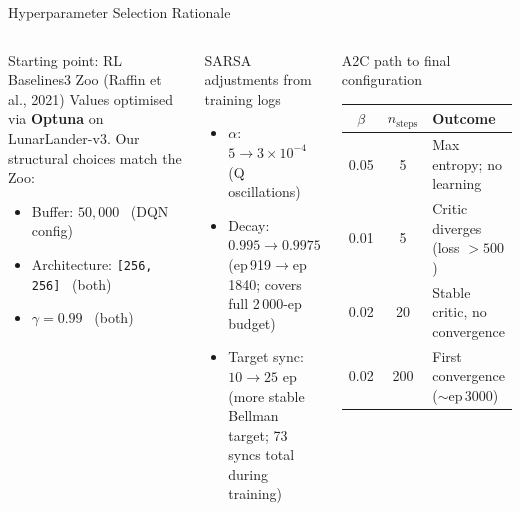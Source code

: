 \documentclass[aspectratio=169, 10pt]{beamer}
\newcommand{\code}[1]{{\color{silver}\texttt{\small #1}}}
\begin{document}
\begin{frame}{Hyperparameter Selection Rationale}
  \begin{columns}[T]
      \begin{block}{Starting point: RL Baselines3 Zoo (Raffin et al., 2021)}
        Values optimised via \textbf{Optuna} on LunarLander-v3.
        Our structural choices match the Zoo:
        \begin{itemize}
          \item Buffer: $50{,}000$ \checkmark\ (DQN config)
          \item Architecture: \code{[256, 256]} \checkmark\ (both)
          \item $\gamma = 0.99$ \checkmark\ (both)
        \end{itemize}
      \end{block}
      \vspace{0.4em}
      \begin{block}{SARSA adjustments from training logs}
        \begin{itemize}
          \item $\alpha$: $5{\to}3 \times 10^{-4}$ (Q oscillations)
          \item Decay: $0.995{\to}0.9975$
                (ep\,919$\to$ep\,1840; covers full 2\,000-ep budget)
          \item Target sync: $10{\to}25$ ep (more stable Bellman
                target; 73 syncs total during training)
        \end{itemize}
      \end{block}
      \begin{block}{A2C path to final configuration}
        \vspace{0.2em}
        \small
        \renewcommand{\arraystretch}{1.2}
        \begin{tabular}{ccl}
          \toprule
          $\beta$ & $n_\text{steps}$ & Outcome\\
          \midrule
          0.05 & 5   & Max entropy; no learning\\
          0.01 & 5   & Critic diverges (loss $>500$)\\
          0.02 & 20  & Stable critic, no convergence\\
          0.02 & 200 & First convergence ($\sim$ep\,3000)\\

\end{tabular}
\end{block}
\end{columns}
\end{frame}
\end{document}
